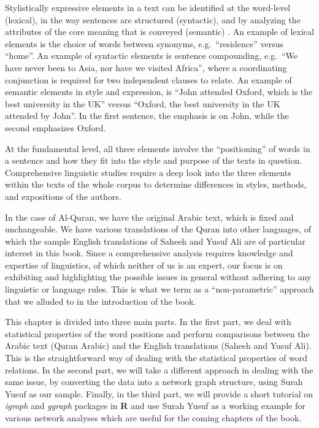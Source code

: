 \documentclass[
]{article}
\begin{document}
Stylistically expressive elements in a text can be identified at the word-level (lexical), in the way sentences are structured (syntactic), and by analyzing the attributes of the core meaning that is conveyed (semantic) \citep{dimarco1988}. An example of lexical elements is the choice of words between synonyms, e.g.~``residence'' versus ``home''. An example of syntactic elements is sentence compounding, e.g.~``We have never been to Asia, nor have we visited Africa'', where a coordinating conjunction is required for two independent clauses to relate. An example of semantic elements in style and expression, is ``John attended Oxford, which is the best university in the UK'' versus ``Oxford, the best university in the UK attended by John''. In the first sentence, the emphasis is on John, while the second emphasizes Oxford.

At the fundamental level, all three elements involve the ``positioning'' of words in a sentence and how they fit into the style and purpose of the texts in question. Comprehensive linguistic studies require a deep look into the three elements within the texts of the whole corpus to determine differences in styles, methods, and expositions of the authors.

In the case of Al-Quran, we have the original Arabic text, which is fixed and unchangeable. We have various translations of the Quran into other languages, of which the sample English translations of Saheeh and Yusuf Ali are of particular interest in this book. Since a comprehensive analysis requires knowledge and expertise of linguistics, of which neither of us is an expert, our focus is on exhibiting and highlighting the possible issues in general without adhering to any linguistic or language rules. This is what we term as a ``non-parametric'' approach that we alluded to in the introduction of the book.

This chapter is divided into three main parts. In the first part, we deal with statistical properties of the word positions and perform comparisons between the Arabic text (Quran Arabic) and the English translations (Saheeh and Yusuf Ali). This is the straightforward way of dealing with the statistical properties of word relations. In the second part, we will take a different approach in dealing with the same issue, by converting the data into a network graph structure, using Surah Yusuf as our sample. Finally, in the third part, we will provide a short tutorial on \emph{igraph} and \emph{ggraph} packages in \textbf{R} and use Surah Yusuf as a working example for various network analyses which are useful for the coming chapters of the book.
\end{document}
